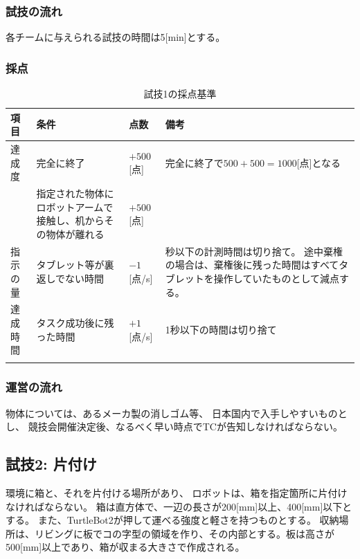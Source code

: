 \documentclass[a4j]{jarticle}
\def\thline{\noalign{\hrule height 1pt}}
\begin{document}
\subsubsection{試技の流れ}

各チームに与えられる試技の時間は5[min]とする。

\subsubsection{採点}

\begin{table}
\begin{center}
\caption{試技1の採点基準}
\label{table:test1score}
\begin{tabular}{l|p{5cm}|l|p{5cm}}
\thline
項目 & 条件 & 点数 & 備考\\
\hline
達成度 & 完全に終了 & $+500$[点] & 完全に終了で$500+500=1000$[点]となる\\
& 指定された物体にロボットアームで接触し、机からその物体が離れる & $+500$[点] \\
\hline
指示の量 & タブレット等が裏返しでない時間& $-1$[点/s] & 秒以下の計測時間は切り捨て。
途中棄権の場合は、棄権後に残った時間はすべてタブレットを操作していたものとして減点する。\\
\hline
達成時間 & タスク成功後に残った時間 & $+1$[点/s] & 1秒以下の時間は切り捨て\\
\thline
\end{tabular}
\end{center}
\end{table}



\subsubsection{運営の流れ}

物体については、あるメーカ製の消しゴム等、
日本国内で入手しやすいものとし、
競技会開催決定後、なるべく早い時点でTCが告知しなければならない。

\subsection{試技2: 片付け}

環境に箱と、それを片付ける場所があり、
ロボットは、箱を指定箇所に片付けなければならない。
箱は直方体で、一辺の長さが200[mm]以上、400[mm]以下とする。
また、TurtleBot2が押して運べる強度と軽さを持つものとする。
収納場所は、リビングに板でコの字型の領域を作り、その内部とする。板は高さが500[mm]以上であり、箱が収まる大きさで作成される。
\end{document}
